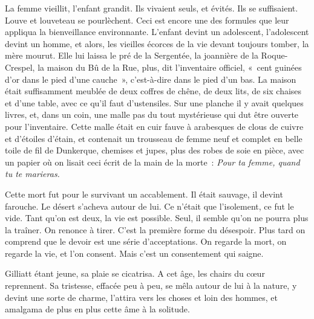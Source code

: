 \documentclass[french,twoside]{book} %
\begin{document}
La femme vieillit, l’enfant grandit. Ils vivaient seuls, et évités. Ils se suffisaient. Louve et louveteau se pourlèchent. Ceci est encore une des formules que leur appliqua la bienveillance environnante. L’enfant devint un adolescent, l’adolescent devint un homme, et alors, les vieilles écorces de la vie devant toujours tomber, la mère mourut. Elle lui laissa le pré de la Sergentée, la joannière de la Roque-Crespel, la maison du Bû de la Rue, plus, dit l’inventaire officiel, « cent guinées d’or dans le pied d’une cauche », c’est-à-dire dans le pied d’un bas. La maison était suffisamment meublée de deux coffres de chêne, de deux lits, de six chaises et d’une table, avec ce qu’il faut d’ustensiles. Sur une planche il y avait quelques livres, et, dans un coin, une malle pas du tout mystérieuse qui dut être ouverte pour l’inventaire. Cette malle était en cuir fauve à arabesques de clous de cuivre et d’étoiles d’étain, et contenait un trousseau de femme neuf et complet en belle toile de fil de Dunkerque, chemises et jupes, plus des robes de soie en pièce, avec un papier où on lisait ceci écrit de la main de la morte : \emph{Pour ta femme, quand tu te marieras.}\par
Cette mort fut pour le survivant un accablement. Il était sauvage, il devint farouche. Le désert s’acheva autour de lui. Ce n’était que l’isolement, ce fut le vide. Tant qu’on est deux, la vie est possible. Seul, il semble qu’on ne pourra plus la traîner. On renonce à tirer. C’est la première forme du désespoir. Plus tard on  comprend que le devoir est une série d’acceptations. On regarde la mort, on regarde la vie, et l’on consent. Mais c’est un consentement qui saigne.\par
Gilliatt étant jeune, sa plaie se cicatrisa. A cet âge, les chairs du cœur reprennent. Sa tristesse, effacée peu à peu, se mêla autour de lui à la nature, y devint une sorte de charme, l’attira vers les choses et loin des hommes, et amalgama de plus en plus cette âme à la solitude.
\end{document}
